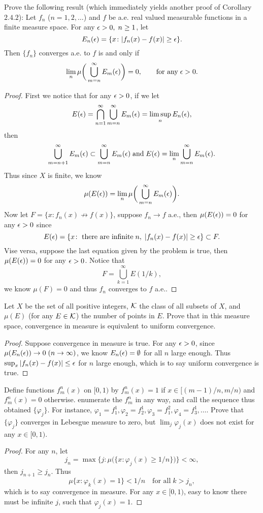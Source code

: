 \begin{pro}%
	Prove the following result (which immediately yields another proof of Corollary $2.4.2$): Let $f_n$ ($n=1,2,\ldots$) and $f$ be a.e. real valued measurable functions in a finite measure space. For any $\epsilon>0,\;n\geq 1$, let
	\[E_n(\epsilon)=\{x\colon |f_n(x)-f(x)|\geq \epsilon\}.\]
	Then $\{f_n\}$ converges a.e. to $f$ is and only if
	\[\lim_n \mu\bigg(\bigcup_{m=n}^\infty E_m(\epsilon)\bigg)=0,\qquad \mbox{for any}\;\epsilon>0.\]
\end{pro}
\begin{proof}
	First we notice that for any $\epsilon>0$, if we let
	\[E(\epsilon)=\bigcap_{n=1}^\infty \bigcup_{m=n}^\infty E_m(\epsilon)=\limsup_n E_n(\epsilon),\]
	then 
	\[\bigcup_{m=n+1}^\infty E_m(\epsilon)\subset\bigcup_{m=n}^\infty E_m(\epsilon)\;\mbox{and}\;E(\epsilon)=\lim_n \bigcup_{m=n}^\infty E_m(\epsilon).\]
	Thus since $X$ is finite, we know 
	\[\mu(E(\epsilon))=\lim_n \mu\bigg(\bigcup_{m=n}^\infty E_m(\epsilon)\bigg).\]
    Now let $F=\{x\colon f_n(x)\not\to f(x)\}$, suppose $f_n\to f$ a.e., then $\mu(E(\epsilon))=0$ for any $\epsilon>0$ since
    \[E(\epsilon)=\{x\colon \;\mbox{there are infinite}\;n,\;|f_n(x)-f(x)|\geq\epsilon\}\subset F.\]
    Vise versa, suppose the last equation given by the problem is true, then $\mu(E(\epsilon))=0$ for any $\epsilon>0$. Notice that
    \[F=\bigcup_{k=1}^\infty E(1/k),\]
    we know $\mu(F)=0$ and thus $f_n$ converges to $f$ a.e..
\end{proof}

\begin{pro}%
	Let $X$ be the set of all positive integers, $\mathcal{K}$ the class of all subsets of $X$, and $\mu(E)$ (for any $E\in\mathcal{K}$) the number of points in $E$. Prove that in this measure space, convergence in measure is equivalent to uniform convergence.
\end{pro}
\begin{proof}
	Suppose convergence in measure is true. For any $\epsilon>0$, since $\mu(E_n(\epsilon))\to 0\;(n\to\infty)$, we know $E_n(\epsilon)=\emptyset$ for all $n$ large enough. Thus $\sup_x |f_n(x)-f(x)|\leq\epsilon$ for $n$ large enough, which is to say uniform convergence is true.
\end{proof}

\begin{pro}%
	Define functions $f_m^n(x)$ on $[0,1)$ by $f_m^n(x)=1$ if $x\in[(m-1)/n,m/n)$ and $f_m^n(x)=0$ otherwise. enumerate the $f_m^n$ in any way, and call the sequence thus obtained $\{\varphi_j\}$. For instance, $\varphi_1=f_1^1,\varphi_2=f_2^1,\varphi_3=f_1^2,\varphi_4=f_3^1,\ldots$. Prove that $\{\varphi_j\}$ converges in Lebesgue measure to zero, but $\lim_{j} \varphi_j(x)$ does not exist for any $x\in[0,1)$.
\end{pro}
\begin{proof}
	For any $n$, let 
	\[j_n=\max\bigg\{j\colon \mu\Big(\{x\colon \varphi_j(x)\geq 1/n\}\Big)\bigg\}<\infty,\]
	then $j_{n+1}\geq j_n$. Thus
	\[\mu\{x\colon \varphi_k(x)=1\}<1/n\quad\mbox{for all}\;k>j_n,\] which is to say convergence in measure. For any $x\in[0,1)$, easy to know there must be infinite $j$, such that $\varphi_j(x)=1$.
\end{proof}

